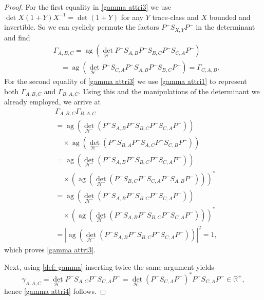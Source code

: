 \documentclass[b5paper,draft,openbib,12pt]{memoir}
\DeclareMathOperator{\ag}{ag}
\begin{document}
\begin{proof}
For the first equality in \eqref{gamma attri3} we use \(\det X (1+Y) X^{-1}=\det (1+Y)\) for any \(Y\) trace-class and 
 \(X\) bounded and invertible. So we can cyclicly permute the factors \(P^- S_{X,Y}P^-\) in the determinant and find
\begin{align*}
&\Gamma_{A,B,C}=\ag(\det_{\mathcal{H}^-} P^- S_{A,B}P^-S_{B,C}P^-S_{C,A}P^- )\\
&\quad=\ag(\det_{\mathcal{H}^-} P^-S_{C,A}P^- S_{A,B}P^-S_{B,C}P^- )
=\Gamma_{C,A,B}.
\end{align*}
For the second equality of \eqref{gamma attri3} we use \eqref{gamma attri1}
to represent both \(\Gamma_{A,B,C}\) and \(\Gamma_{B,A,C}\). Using this and the manipulations of the determinant 
we already employed, we arrive at
\begin{align}
&\Gamma_{A,B,C}\Gamma_{B,A,C}\\
&=\ag(\det_{\mathcal{H}^-} (P^-S_{A,B}P^-S_{B,C}P^-S_{C,A}P^-))\\
&\quad\times\ag(\det_{\mathcal{H}^-} (P^-S_{B,A}P^-S_{A,C}P^-S_{C,B}P^-))\\
&=\ag(\det_{\mathcal{H}^-} (P^-S_{A,B}P^-S_{B,C}P^-S_{C,A}P^-))\\
&\quad\times(\ag(\det_{\mathcal{H}^-} (P^-S_{B,C}P^-S_{C,A}P^-S_{A,B}P^-)))^*\\
&=\ag(\det_{\mathcal{H}^-} (P^-S_{A,B}P^-S_{B,C}P^-S_{C,A}P^-))\\
&\quad\times(\ag(\det_{\mathcal{H}^-} (P^-S_{A,B}P^-S_{B,C}P^-S_{C,A}P^-)))^*\\
&=|\ag(\det_{\mathcal{H}^-} (P^-S_{A,B}P^-S_{B,C}P^-S_{C,A}P^-))|^2=1,
\end{align}
which proves \eqref{gamma attri3}. 

Next, using \eqref{def: gamma} inserting twice the same argument yields
\begin{equation}
\gamma_{A,A,C}=\det_{\mathcal{H}^-} P^-S_{A,C}P^-S_{C,A}P^-
=\det_{\mathcal{H}^-} (P^- S_{C,A} P^-)^*P^-S_{C,A}P^-\in \mathbb{R}^+,
\end{equation}
hence \eqref{gamma attri4} follows.



\end{proof}
\end{document}
